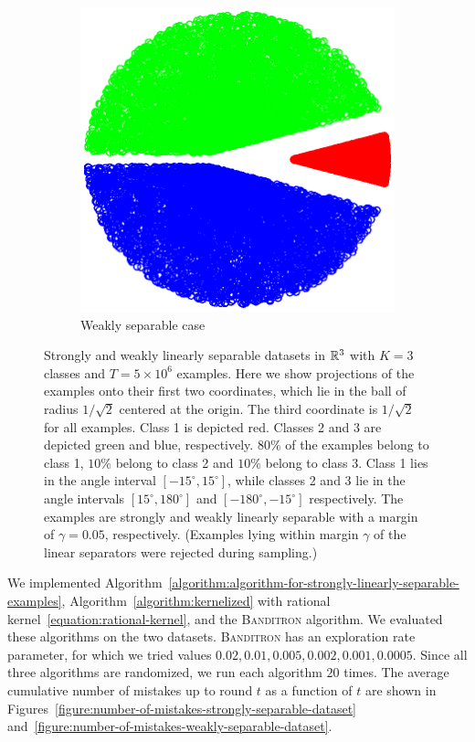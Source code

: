 \begin{figure}[h]
\begin{subfigure}[b]{0.23\textwidth}
\centering
\hspace*{-0.3cm}  \includegraphics[width=1.15\textwidth, trim={0, 0cm, 0, 0}, clip]{figures/weak_points}
\caption{Weakly separable case}
\label{figure:weakly-separable-dataset}
\end{subfigure}
\vspace*{-0.2cm}
\caption{Strongly and weakly linearly separable datasets in $\mathbb{R}^3$ with $K=3$
classes and $T=5\times 10^6$ examples. Here we show projections of the examples
onto their first two coordinates, which lie in the ball of radius $1/\sqrt{2}$
centered at the origin. The third coordinate is $1/\sqrt{2}$ for all examples.
Class 1 is depicted red. Classes 2 and 3 are depicted green and blue,
respectively. $80\%$ of the examples belong to class 1, $10\%$ belong to class 2
and $10\%$ belong to class 3. Class 1 lies in the angle interval $[-15^\circ,
15^\circ]$, while classes 2 and 3 lie in the angle intervals $[15^\circ,
180^\circ]$ and $[-180^\circ, -15^\circ]$ respectively. The examples are
strongly and weakly linearly separable with a margin of $\gamma=0.05$,
respectively. (Examples lying within margin $\gamma$ of the linear separators
were rejected during sampling.)}
\label{figure:strongly-and-weakly-separable-datasets}
\end{figure}

We implemented
Algorithm~\ref{algorithm:algorithm-for-strongly-linearly-separable-examples},
Algorithm~\ref{algorithm:kernelized} with rational
kernel~\eqref{equation:rational-kernel}, and the \textsc{Banditron} algorithm.
We evaluated these algorithms on the two datasets. \textsc{Banditron} has an
exploration rate parameter, for which we tried values $0.02, 0.01, 0.005, 0.002,
0.001, 0.0005$. Since all three algorithms are randomized, we run each algorithm
$20$ times. The average cumulative number of mistakes up to round $t$ as a
function of $t$ are shown in
Figures~\ref{figure:number-of-mistakes-strongly-separable-dataset}
and~\ref{figure:number-of-mistakes-weakly-separable-dataset}.

